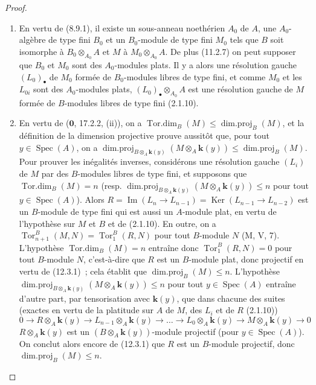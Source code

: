 \begin{proof}
\begin{enumerate}[label=(\roman*)]
  \item En vertu de (8.9.1), il existe un sous-anneau noethérien $A_0$ de $A$,
  une $A_0$-algèbre de type fini $B_0$ et un $B_0$-module de type fini $M_0$
  tels que $B$ soit isomorphe à $B_0\otimes_{A_0}A$ et $M$ à
  $M_0\otimes_{A_0}A$. De plus (11.2.7) on peut supposer que $B_0$ et $M_0$
  sont des $A_0$-modules plats. Il y a alors une résolution gauche
  $(L_0)_\bullet$ de $M_0$ formée de $B_0$-modules libres de type fini, et
  comme $M_0$ et les $L_{0i}$ sont des $A_0$-modules plats,
  $(L_0)_\bullet\otimes_{A_0}A$ est une résolution gauche de $M$ formée de
  $B$-modules libres de type fini (2.1.10).

  \item En vertu de ($\mathbf 0$, 17.2.2, (ii)), on a
  $\operatorname{Tor.dim}_B(M)\leq\operatorname{dim.proj}_B(M)$, et la
  définition de la dimension projective prouve aussitôt que, pour tout
  $y\in\operatorname{Spec}(A)$, on a
  $\operatorname{dim.proj}_{B\otimes_A\mathbf{k}(y)}(M\otimes_A\boldsymbol{k}(y))\leq\operatorname{dim.proj}_B(M)$.
  Pour prouver les inégalités inverses, considérons une résolution gauche
  $(L_i)$ de $M$ par des $B$-modules libres de type fini, et supposons que
  $\operatorname{Tor.dim}_B(M)=n$ (resp.
  $\operatorname{dim.proj}_{B\otimes_A\mathbf{k}(y)}(M\otimes_A\boldsymbol{k}(y))\leq n$ pour tout
  $y\in\operatorname{Spec}(A)$). Alors
  $R=\operatorname{Im}(L_n\to L_{n-1})=\operatorname{Ker}(L_{n-1}\to L_{n-2})$
  est un $B$-module de type fini qui est aussi un $A$-module plat, en vertu de
  l'hypothèse sur $M$ et $B$ et de (2.1.10). En outre, on a
  $\operatorname{Tor}^B_{n+1}(M,N)=\operatorname{Tor}^B_1(R,N)$ pour tout
  $B$-module $N$ (M, V, 7). L'hypothèse $\operatorname{Tor.dim}_B(M)=n$
  entraîne donc $\operatorname{Tor}^B_1(R,N)=0$ pour tout $B$-module $N$,
  c'est-à-dire que $R$ est un $B$-module plat, donc projectif en vertu de
  (12.3.1)~; cela établit que $\operatorname{dim.proj}_B(M)\leq n$.
  L'hypothèse
  $\operatorname{dim.proj}_{B\otimes_A\mathbf{k}(y)}(M\otimes_A\boldsymbol{k}(y))\leq n$ pour tout
  $y\in\operatorname{Spec}(A)$ entraîne d'autre part, par tensorisation avec
  $\boldsymbol{k}(y)$, que dans chacune des suites (exactes en vertu de la platitude sur $A$
  de $M$, des $L_i$ et de $R$ (2.1.10))
  \[
    0\to R\otimes_A\boldsymbol{k}(y)\to L_{n-1}\otimes_A\boldsymbol{k}(y)\to\ldots
    \to L_0\otimes_A\boldsymbol{k}(y)\to M\otimes_A\boldsymbol{k}(y)\to0
  \]
  $R\otimes_A\boldsymbol{k}(y)$ est un $(B\otimes_A\boldsymbol{k}(y))$-module projectif (pour
  $y\in\operatorname{Spec}(A)$). On conclut alors encore de (12.3.1) que $R$
  est un $B$-module projectif, donc $\operatorname{dim.proj}_B(M)\leq n$.
\end{enumerate}
\end{proof}

